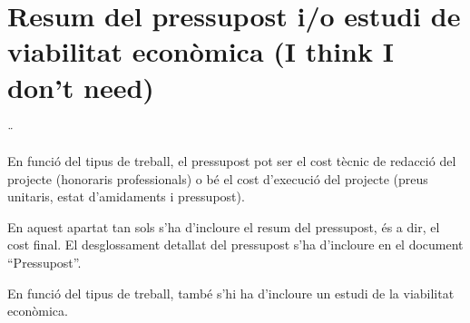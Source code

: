 \chapter{Resum del pressupost i/o estudi de viabilitat econòmica (I think I don't need)}¨

En funció del tipus de treball, el pressupost pot ser el cost tècnic de redacció del projecte (honoraris professionals) o bé el cost d’execució del projecte (preus unitaris, estat d’amidaments i pressupost).

En aquest apartat tan sols s’ha d’incloure el resum del pressupost, és a dir, el cost final. El desglossament detallat del pressupost s’ha d’incloure en el document “Pressupost”.

En funció del tipus de treball, també s’hi ha d’incloure un estudi de la viabilitat econòmica.
